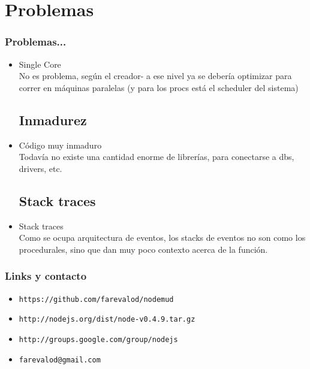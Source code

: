 \documentclass{beamer}
\begin{document}
\section{Problemas}
\begin{frame}
\frametitle{Problemas...}
\begin{itemize}
\subsection{Single Core}
\item Single Core\\
No es problema, seg\'un el creador- a ese nivel ya se deber\'ia optimizar para correr en m\'aquinas paralelas (y para los procs est\'a el scheduler del sistema)
\subsection{Inmadurez}
\item C\'odigo muy inmaduro\\
Todav\'ia no existe una cantidad enorme de librer\'ias, para conectarse a dbs, drivers, etc.
\subsection{Stack traces}
\item Stack traces\\
Como se ocupa arquitectura de eventos, los stacks de eventos no son como los procedurales, sino que dan muy poco contexto acerca de la funci\'on.
\end{itemize}
\end{frame}
\begin{frame}
\frametitle{Links y contacto}
\begin{itemize}
\item \texttt{https://github.com/farevalod/nodemud}
\item \texttt{http://nodejs.org/dist/node-v0.4.9.tar.gz}
\item \texttt{http://groups.google.com/group/nodejs}
\item \texttt{farevalod@gmail.com}
\end{itemize}
\end{frame}
\end{document}
